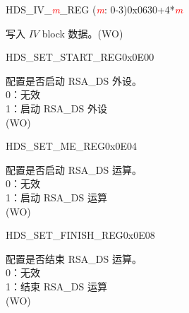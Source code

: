 


\begin{register}{H}{DS\_IV\_\textcolor{red}{\it{m}}\_REG (\textcolor{red}{\it{m}}: 0-3)}{0x0630+4*\textcolor{red}{\it{m}}}\label{regdesc:DSIVREG}
%
\regnewline%
\begin{regdesc}\begin{reglist}
\item [DS\_IV\_\textcolor{red}{\it{m}}\_REG (\textcolor{red}{\it{m}}: 0-3)] 写入 \begin{math}IV\end{math} block 数据。(WO)
\end{reglist}\end{regdesc}
\end{register}


\begin{register}{H}{DS\_SET\_START\_REG}{0x0E00}\label{regdesc:DSSETSTARTREG}
%
%
\regnewline%
\begin{regdesc}\begin{reglist}
\item [DS\_SET\_START] 配置是否启动 RSA\_DS 外设。\\
0：无效\\
1：启动 RSA\_DS 外设\\
(WO)
\end{reglist}\end{regdesc}
\end{register}


\begin{register}{H}{DS\_SET\_ME\_REG}{0x0E04}\label{regdesc:DSSETMEREG}
%
%
\regnewline%
\begin{regdesc}\begin{reglist}
\item [DS\_SET\_ME] 配置是否启动 RSA\_DS 运算。\\
0：无效\\
1：启动 RSA\_DS 运算\\
(WO)
\end{reglist}\end{regdesc}
\end{register}


\begin{register}{H}{DS\_SET\_FINISH\_REG}{0x0E08}\label{regdesc:DSSETFINISHREG}
%
%
\regnewline%
\begin{regdesc}\begin{reglist}
\item [DS\_SET\_FINISH] 配置是否结束 RSA\_DS 运算。\\
0：无效\\
1：结束 RSA\_DS 运算\\
(WO)
\end{reglist}\end{regdesc}
\end{register}


